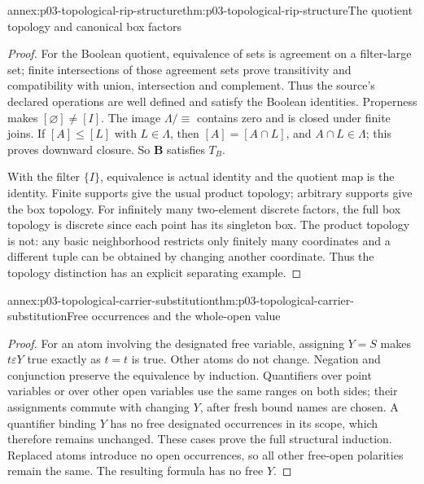 \begin{annexitem}{annex:p03-topological-rip-structure}{thm:p03-topological-rip-structure}{The quotient topology and canonical box factors}
\begin{proof}
For the Boolean quotient, equivalence of sets is agreement on a
filter-large set; finite intersections of those agreement sets prove
transitivity and compatibility with union, intersection and complement.
Thus the source's declared operations are well defined and satisfy the
Boolean identities. Properness makes \([\varnothing]\ne[I]\).
The image \(\Lambda/{\equiv}\) contains zero and is closed under
finite joins. If \([A]\le[L]\) with \(L\in\Lambda\), then
\([A]=[A\cap L]\), and \(A\cap L\in\Lambda\); this proves
downward closure. So \(\mathbf B\) satisfies \(T_B\).

With the filter \(\{I\}\), equivalence is actual identity and the
quotient map is the identity. Finite supports give the usual product
topology; arbitrary supports give the box topology. For infinitely many
two-element discrete factors, the full box topology is discrete since each
point has its singleton box. The product topology is not: any basic
neighborhood restricts only finitely many coordinates and a different
tuple can be obtained by changing another coordinate. Thus the topology
distinction has an explicit separating example.
\end{proof}
\end{annexitem}

\begin{annexitem}{annex:p03-topological-carrier-substitution}{thm:p03-topological-carrier-substitution}{Free occurrences and the whole-open value}
\begin{proof}
For an atom involving the designated free variable, assigning \(Y=S\)
makes \(t\varepsilon Y\) true exactly as \(t=t\) is true. Other
atoms do not change. Negation and conjunction preserve the equivalence
by induction. Quantifiers over point variables or over other open variables
use the same ranges on both sides; their assignments commute with changing
\(Y\), after fresh bound names are chosen. A quantifier binding \(Y\)
has no free designated occurrences in its scope, which therefore remains
unchanged. These cases prove the full structural induction. Replaced atoms
introduce no open occurrences, so all other free-open polarities remain
the same. The resulting formula has no free \(Y\).
\end{proof}
\end{annexitem}

